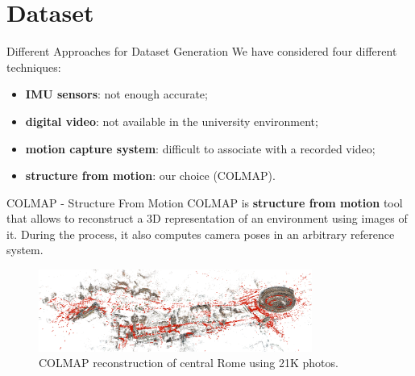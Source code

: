\documentclass[
    center,
]{beamer}
\begin{document}
\section{Dataset}
\begin{frame}{Different Approaches for Dataset Generation}
    We have considered four different techniques:
    \begin{itemize}
        \item \textbf{IMU sensors}: not enough accurate;
        \item \textbf{digital video}: not available in the university environment;
        \item \textbf{motion capture system}: difficult to associate with a recorded video;
        \item \textbf{structure from motion}: our choice (COLMAP).
    \end{itemize}
\end{frame}
\begin{frame}{COLMAP - Structure From Motion}
    COLMAP is \textbf{structure from motion} tool that allows to reconstruct a 3D representation of an environment using images of it. During the process, it also computes camera poses in an arbitrary reference system.
    \vspace{10px}
    \begin{figure}
        \centering
        \includegraphics[width=0.8\textwidth]{../imgs/colmap_rome.png}
        \caption{COLMAP reconstruction of central Rome using 21K photos.}
    \end{figure}
\end{frame}
\end{document}
